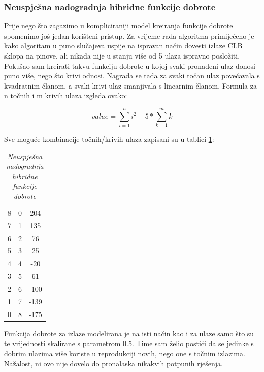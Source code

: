 \documentclass[times, utf8, zavrsni]{fer}
\begin{document}
\subsubsection{Neuspješna nadogradnja hibridne funkcije dobrote}

Prije nego što zagazimo u kompliciraniji model kreiranja funkcije dobrote spomenimo još jedan korišteni pristup. Za vrijeme rada algoritma primijećeno je kako algoritam u puno slučajeva uspije na ispravan način dovesti izlaze CLB sklopa na pinove, ali nikada nije u stanju više od 5 ulaza ispravno posložiti. Pokušao sam kreirati takvu funkciju dobrote u kojoj svaki pronađeni ulaz donosi puno više, nego što krivi odnosi. Nagrada se tada za svaki točan ulaz povećavala s kvadratnim članom, a svaki krivi ulaz smanjivala s linearnim članom. Formula za n točnih i m krivih ulaza izgleda ovako: 

\begin{equation}
	value=\sum_{i=1}^{n}i^2 - 5\ast \sum_{k=1}^{m}k
\end{equation}

Sve moguće kombinacije točnih/krivih ulaza zapisani su u tablici \ref{NadograđenaHibridnaFunkcija}: 

\begin{table}[htb]
	\caption{\emph{Neuspješna nadogradnja hibridne funkcije dobrote}}
	\label{NadograđenaHibridnaFunkcija}
	\centering
	\begin{tabular}{|c | c | c|} \hline
		\thead{Točnih} & \thead{Krivih} & \thead{Vrijednost} \\ \hline
		8 & 0 & 204 \\ \hline
		7 & 1 & 135 \\ \hline
		6 & 2 & 76 \\ \hline
		5 & 3 & 25 \\ \hline
		4 & 4 & -20 \\ \hline
		3 & 5 & 61 \\ \hline
		2 & 6 & -100 \\ \hline
		1 & 7 & -139 \\ \hline
		0 & 8 & -175 \\ \hline
	\end{tabular}
\end{table}

Funkcija dobrote za izlaze modelirana je na isti način kao i za ulaze samo što su te vrijednosti skalirane s parametrom 0.5. Time sam želio postići da se jedinke s dobrim ulazima više koriste u reprodukciji novih, nego one s točnim izlazima. Nažalost, ni ovo nije dovelo do pronalaska nikakvih potpunih rješenja. \\
\end{document}
